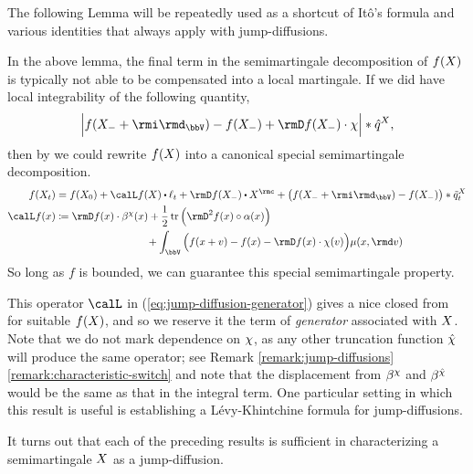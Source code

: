 

The following Lemma will be repeatedly used as a shortcut of It\^o's formula and various identities that always apply with jump-diffusions.



In the above lemma, the final term in the semimartingale decomposition of $f(X)$ is typically not able to be compensated into a local martingale.
If we did have local integrability of the following quantity,
\begin{equation*}
  \Big| f(\X_-+\id_\vecSpace) - f(\X_-) + \Der f(\X_-) \cdot \trunc \Big| \ast \predproj{\jumpMeas^\X},
\end{equation*}
then by \cite[Proposition II.1.28]{jacod2003} we could rewrite $f(X)$ into a canonical special semimartingale decomposition.
\begin{equation}
  \label{eq:jump-diffusion-generator}
  \begin{aligned}
    f(\X_t) &= f(\X_0) + \generator f(\X) \shortInt \leb_t + \Der f(\X_-) \shortInt \X^\rmc + \big( f(\X_- + \id_\vecSpace) - f(\X_-) \big) \ast \compensate{\jumpMeas^\X}_t \\
    \generator f(\stateVar) &\defeq \begin{aligned}[t]
      &\Der f(\stateVar) \cdot \affDrift^\trunc(\stateVar) + \frac12 \tr\Big( \Hess f(\stateVar) \circ \affDiff(\stateVar) \Big) \\
      &\hspace{25mm}+ \int_\vecSpace \Big( f(\stateVar + \markVar) - f(\stateVar) - \Der f(\stateVar) \cdot \trunc(\markVar) \Big) \affJump(\stateVar, \rmd\markVar)
    \end{aligned}
  \end{aligned}
\end{equation}
So long as $f$ is bounded, we can guarantee this special semimartingale property.



This operator $\generator$ in (\ref{eq:jump-diffusion-generator}) gives a nice closed from for suitable $f(X)$, and so we reserve it the term of \emph{generator} associated with $X$.
Note that we do not mark dependence on $\chi$, as any other truncation function $\hat{\chi}$ will produce the same operator; see Remark \ref{remark:jump-diffusions}\ref{remark:characteristic-switch} and note that the displacement from $\beta^\chi$ and $\beta^{\hat{\chi}}$ would be the same as that in the integral term.
One particular setting in which this result is useful is establishing a L\'evy-Khintchine formula for jump-diffusions.



It turns out that each of the preceding results is sufficient in characterizing a semimartingale $X$ as a jump-diffusion.



